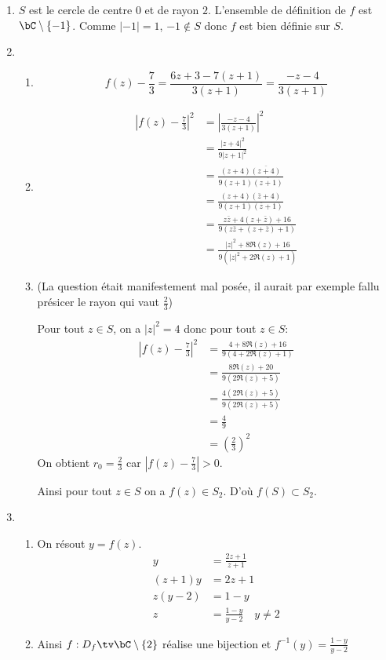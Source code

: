 \documentclass[a4paper, 11pt,reqno]{article}
\begin{document}
\begin{correction}
\begin{enumerate}
\item $S$ est le cercle de centre $0$ et de rayon $2$. L'ensemble de définition de $f$ est $\bC\setminus \{ -1\}$. Comme $|-1|=1$, $-1\notin S$ donc $f$ est bien définie sur $S$. 
\item 
\begin{enumerate}
\item $$f(z)-\frac{7}{3}= \frac{6z+3 - 7(z+1)}{3(z+1)} = \frac{-z -4}{3(z+1)}$$
\item
\begin{align*}
\left| f(z) -\frac{7}{3}\right|^2 &= \left| \frac{-z -4}{3(z+1)}\right|^2\\
												&=  \frac{ |z +4|^2}{9|z+1|^2}\\
												&=  \frac{ (z +4)\overline{(z +4)}}{9(z+1)\overline{(z+1)}}\\
												&=  \frac{ (z +4)(\bar{z} +4)}{9(z+1)(\overline{z}+1)}\\
												&=  \frac{ z\bar{z}  +4(z+\bar{z} )+16}{9(z\bar{z} +(z+\overline{z})+1)}\\
												&=\frac{ |z|^2  +8\Re(z)+16}{9(|z|^2  +2\Re(z)+1)}
\end{align*}

\item  (La question était manifestement mal posée, il aurait par exemple fallu présicer le rayon qui vaut $\frac{2}{3}$) 

 Pour tout $z\in S$, on  a $|z|^2=4$ donc pour tout $z\in S$:
\begin{align*}
\left| f(z) -\frac{7}{3}\right|^2 &=\frac{ 4  +8\Re(z)+16}{9(4 +2\Re(z)+1)}\\
												&=\frac{ 8\Re(z)+20}{9( 2\Re(z)+5)}\\
												&=\frac{4 (2\Re(z)+5)}{9( 2\Re(z)+5)}\\
												&= \frac{4}{9}\\
												&=\left(\frac{2}{3}\right)^2
\end{align*}
On obtient $r_0=\frac{2}{3}$ car $\left| f(z) -\frac{7}{3}\right|>0$. 

Ainsi pour tout $z\in S$ on a $f(z) \in S_2$. D'où $f(S) \subset S_2$. 

\end{enumerate}
\item 
\begin{enumerate}
\item On résout $y = f(z) $. 
\begin{align*}
y&= \frac{2z+1}{z+1}\\
(z+1)y &= 2z+1\\
z(y-2) &= 1-y\\
z &= \frac{1-y}{y-2}\quad y\neq 2
\end{align*}
\item Ainsi $f : D_f \tv \bC\setminus \{ 2\} $ réalise une bijection et $f^{-1} (y) =\frac{1-y}{y-2}$


\end{enumerate}
\end{enumerate}
\end{correction}
\end{document}
